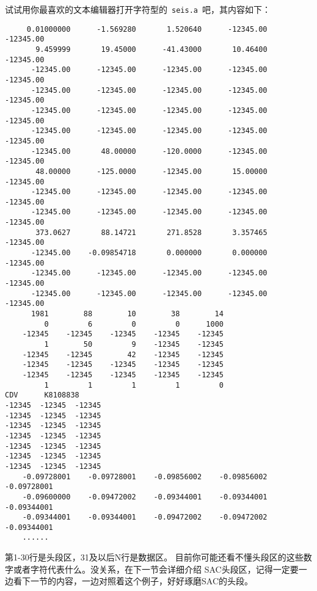 试试用你最喜欢的文本编辑器打开字符型的~\verb+seis.a+~吧，其内容如下：
\begin{verbatim}
     0.01000000      -1.569280       1.520640      -12345.00      -12345.00
       9.459999       19.45000      -41.43000       10.46400      -12345.00
      -12345.00      -12345.00      -12345.00      -12345.00      -12345.00
      -12345.00      -12345.00      -12345.00      -12345.00      -12345.00
      -12345.00      -12345.00      -12345.00      -12345.00      -12345.00
      -12345.00      -12345.00      -12345.00      -12345.00      -12345.00
      -12345.00       48.00000      -120.0000      -12345.00      -12345.00
       48.00000      -125.0000      -12345.00       15.00000      -12345.00
      -12345.00      -12345.00      -12345.00      -12345.00      -12345.00
      -12345.00      -12345.00      -12345.00      -12345.00      -12345.00
       373.0627       88.14721       271.8528       3.357465      -12345.00
      -12345.00    -0.09854718       0.000000       0.000000      -12345.00
      -12345.00      -12345.00      -12345.00      -12345.00      -12345.00
      -12345.00      -12345.00      -12345.00      -12345.00      -12345.00
      1981        88        10        38        14
         0         6         0         0      1000
    -12345    -12345    -12345    -12345    -12345
         1        50         9    -12345    -12345
    -12345    -12345        42    -12345    -12345
    -12345    -12345    -12345    -12345    -12345
    -12345    -12345    -12345    -12345    -12345
         1         1         1         1         0
CDV      K8108838
-12345  -12345  -12345
-12345  -12345  -12345
-12345  -12345  -12345
-12345  -12345  -12345
-12345  -12345  -12345
-12345  -12345  -12345
-12345  -12345  -12345
    -0.09728001    -0.09728001    -0.09856002    -0.09856002    -0.09728001
    -0.09600000    -0.09472002    -0.09344001    -0.09344001    -0.09344001
    -0.09344001    -0.09344001    -0.09472002    -0.09472002    -0.09344001
    ......
\end{verbatim}

第1-30行是头段区，31及以后N行是数据区。
目前你可能还看不懂头段区的这些数字或者字符代表什么。没关系，在下一节会详细介绍
SAC头段区，记得一定要一边看下一节的内容，一边对照着这个例子，好好琢磨SAC的头段。
